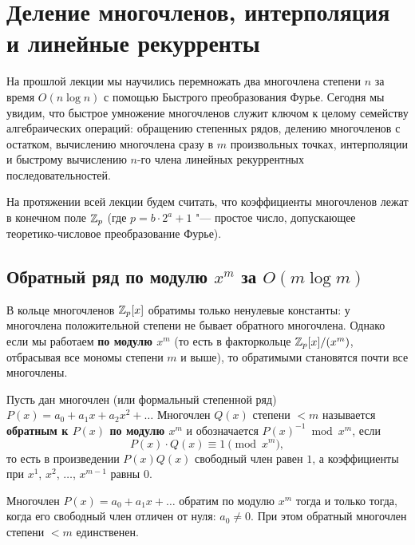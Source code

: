 \section{Деление многочленов, интерполяция и линейные рекурренты}

На прошлой лекции мы научились перемножать два многочлена степени $n$ за время $O(n \log n)$ с помощью Быстрого преобразования Фурье. Сегодня мы увидим, что быстрое умножение многочленов служит ключом к целому семейству алгебраических операций: обращению степенных рядов, делению многочленов с остатком, вычислению многочлена сразу в $m$ произвольных точках, интерполяции и быстрому вычислению $n$-го члена линейных рекуррентных последовательностей.

На протяжении всей лекции будем считать, что коэффициенты многочленов лежат в конечном поле $\mathbb{Z}_p$ (где $p = b \cdot 2^a + 1$ "--- простое число, допускающее теоретико-числовое преобразование Фурье).

\subsection{Обратный ряд по модулю \texorpdfstring{$x^m$}{x\^m} за \texorpdfstring{$O(m \log m)$}{O(m log m)}}

В кольце многочленов $\mathbb{Z}_p[x]$ обратимы только ненулевые константы: у многочлена положительной степени не бывает обратного многочлена. Однако если мы работаем \textbf{по модулю $x^m$} (то есть в факторкольце $\mathbb{Z}_p[x] / (x^m)$, отбрасывая все мономы степени $m$ и выше), то обратимыми становятся почти все многочлены.

\begin{definition}
    Пусть дан многочлен (или формальный степенной ряд) $P(x) = a_0 + a_1 x + a_2 x^2 + \dots$ Многочлен $Q(x)$ степени $< m$ называется \textbf{обратным к $P(x)$ по модулю $x^m$} и обозначается $P(x)^{-1} \bmod x^m$, если
    \[
        P(x) \cdot Q(x) \equiv 1 \pmod{x^m},
    \]
    то есть в произведении $P(x) Q(x)$ свободный член равен $1$, а коэффициенты при $x^1$, $x^2$, $\dots$, $x^{m-1}$ равны $0$.
\end{definition}

\begin{proposition}
    Многочлен $P(x) = a_0 + a_1 x + \dots$ обратим по модулю $x^m$ тогда и только тогда, когда его свободный член отличен от нуля: $a_0 \ne 0$. При этом обратный многочлен степени $< m$ единственен.
\end{proposition}

